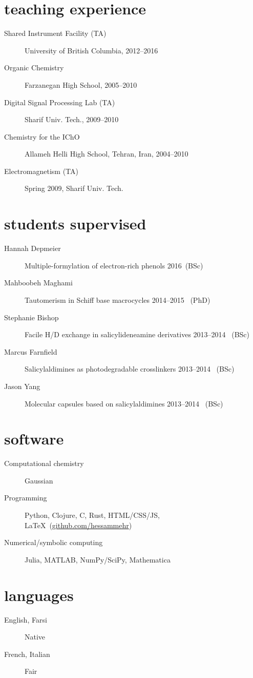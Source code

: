 \documentclass[overlapped,line,10pt,letterpaper]{res}
\begin{document}
\begin{resume}
\section{teaching experience}
\begin{description}
\item[Shared Instrument Facility (TA)] University of British Columbia, 2012–2016
\item[Organic Chemistry] Farzanegan High School, 2005–2010
\item[Digital Signal Processing Lab (TA)] Sharif Univ. Tech., 2009–2010
\item[Chemistry for the IChO] Allameh Helli High School, Tehran, Iran, 2004–2010
\item[Electromagnetism (TA)] Spring 2009, Sharif Univ. Tech.
\end{description}

\section{students supervised}
\begin{description}
\item[Hannah Depmeier] Multiple-formylation of electron-rich phenols \hspace{\fill} 2016\, (BSc)
\item[Mahboobeh Maghami] Tautomerism in Schiff base macrocycles \hspace{\fill} 2014–2015 \, (PhD)
\item[Stephanie Bishop] Facile H/D exchange in salicylideneamine derivatives \hspace{\fill} 2013–2014 \, (BSc)
\item[Marcus Farnfield]  Salicylaldimines as photodegradable crosslinkers \hspace{\fill} 2013–2014 \, (BSc)
\item[Jason Yang]  Molecular capsules based on salicylaldimines \hspace{\fill} 2013–2014 \, (BSc)
\end{description}

\section{software}
\begin{description}
\item[Computational chemistry] Gaussian
\item[Programming] Python, Clojure, C, Rust, HTML/CSS/JS, \LaTeX \ (\href{https://github.com/hessammehr}{github.com/hessammehr})
\item[Numerical/symbolic computing] Julia, MATLAB, NumPy/SciPy, Mathematica
\end{description}

\section{languages}
\begin{description}
\item[English, Farsi] Native
\item[French, Italian] Fair
\end{description}
\end{resume}
\end{document}
